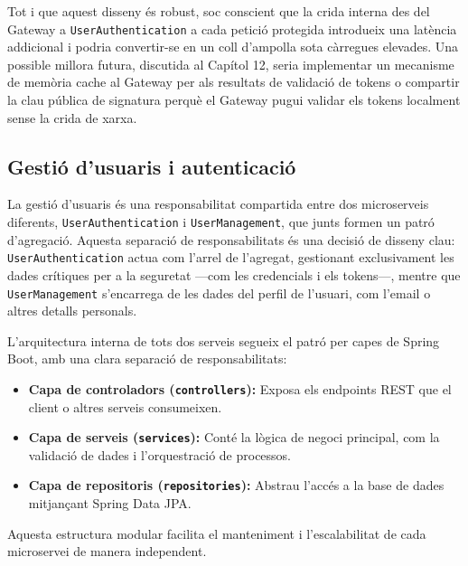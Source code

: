 Tot i que aquest disseny és robust, soc conscient que la crida interna des del Gateway a \texttt{UserAuthentication} a cada petició protegida introdueix una latència addicional i podria convertir-se en un coll d'ampolla sota càrregues elevades. Una possible millora futura, discutida al Capítol 12, seria implementar un mecanisme de memòria cache al Gateway per als resultats de validació de tokens o compartir la clau pública de signatura perquè el Gateway pugui validar els tokens localment sense la crida de xarxa.

\subsection{Gestió d'usuaris i autenticació}

La gestió d'usuaris és una responsabilitat compartida entre dos microserveis diferents, \texttt{UserAuthentication} i \texttt{UserManagement}, que junts formen un patró d'agregació. Aquesta separació de responsabilitats és una decisió de disseny clau: \texttt{UserAuthentication} actua com l'arrel de l'agregat, gestionant exclusivament les dades crítiques per a la seguretat —com les credencials i els tokens—, mentre que \texttt{UserManagement} s'encarrega de les dades del perfil de l'usuari, com l'email o altres detalls personals.

L'arquitectura interna de tots dos serveis segueix el patró per capes de Spring Boot, amb una clara separació de responsabilitats:
\begin{itemize}
    \item \textbf{Capa de controladors (\texttt{controllers}):} Exposa els endpoints REST que el client o altres serveis consumeixen.
    \item \textbf{Capa de serveis (\texttt{services}):} Conté la lògica de negoci principal, com la validació de dades i l'orquestració de processos.
    \item \textbf{Capa de repositoris (\texttt{repositories}):} Abstrau l'accés a la base de dades mitjançant Spring Data JPA.
\end{itemize}

Aquesta estructura modular facilita el manteniment i l'escalabilitat de cada microservei de manera independent. 


